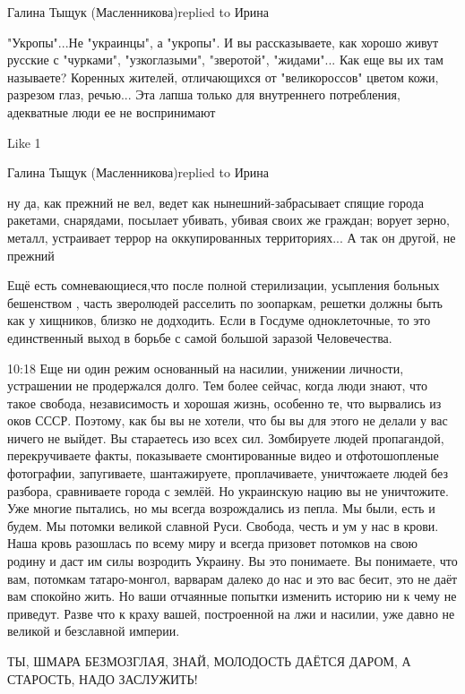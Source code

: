 Галина Тыщук (Масленникова)replied to Ирина

"Укропы"...Не "украинцы", а "укропы". И вы рассказываете, как хорошо живут
русские с "чурками", "узкоглазыми", "зверотой", "жидами"... Как еще вы их там
называете? Коренных жителей, отличающихся от "великороссов" цветом кожи,
разрезом глаз, речью... Эта лапша только для внутреннего потребления,
адекватные люди ее не воспринимают

    Like 1

Галина Тыщук (Масленникова)replied to Ирина

ну да, как прежний не вел, ведет как нынешний-забрасывает спящие города
ракетами, снарядами, посылает убивать, убивая своих же граждан; ворует зерно,
металл, устраивает террор на оккупированных территориях... А так он другой, не
прежний


Ещё есть сомневающиеся,что после полной стерилизации, усыпления больных
бешенством , часть зверолюдей расселить по зоопаркам, решетки должны быть как у
хищников, близко не додходить. Если в Госдуме одноклеточные, то это
единственный выход в борьбе с самой большой заразой Человечества.

10:18
Еще ни один режим основанный на насилии, унижении личности, устрашении не
продержался долго. Тем более сейчас, когда люди знают, что такое свобода,
независимость и хорошая жизнь, особенно те, что вырвались из оков СССР.
Поэтому, как бы вы не хотели, что бы вы для этого не делали у вас ничего не
выйдет. Вы стараетесь изо всех сил. Зомбируете людей пропагандой,
перекручиваете факты, показываете смонтированные видео и отфотошопленые
фотографии,  запугиваете, шантажируете, проплачиваете, уничтожаете людей без
разбора, сравниваете города с землёй. Но украинскую нацию вы не уничтожите. Уже
многие пытались, но мы всегда возрождались из пепла. Мы были, есть и будем. Мы
потомки великой славной Руси. Свобода, честь и ум у нас в крови. Наша кровь
разошлась по всему миру и всегда призовет потомков на свою родину и даст им
силы возродить Украину. Вы это понимаете. Вы понимаете, что вам, потомкам
татаро-монгол, варварам далеко до нас и это вас бесит, это не даёт вам спокойно
жить. Но ваши отчаянные попытки изменить историю ни к чему не приведут. Разве
что к краху вашей, построенной на лжи и насилии, уже давно не великой и
безславной империи.

ТЫ, ШМАРА БЕЗМОЗГЛАЯ, ЗНАЙ, МОЛОДОСТЬ ДАЁТСЯ ДАРОМ, А СТАРОСТЬ, НАДО ЗАСЛУЖИТЬ!

